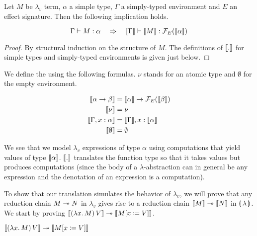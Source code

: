 \begin{property}
  Let $M$ be $\lambda_v$ term, $\alpha$ a simple type, $\Gamma$ a
  simply-typed environment and $E$ an effect signature. Then the following
  implication holds.

$$
\Gamma \vdash M : \alpha
\quad \Rightarrow \quad
\llbracket \Gamma \rrbracket \vdash \llbracket M \rrbracket : \mathcal{F}_E(\llbracket \alpha \rrbracket)
$$
\end{property}

\begin{proof}
  By structural induction on the structure of $M$. The definitions of
  $\llbracket . \rrbracket$ for simple types and simply-typed environments is given just
  below.
\end{proof}

\begin{definition}
We define the  using the
following formulas. $\nu$ stands for an atomic type and $\emptyset$ for the
empty environment.

\begin{align*}
  \llbracket \alpha \to \beta \rrbracket &= \llbracket \alpha \rrbracket \to \mathcal{F}_E(\llbracket \beta \rrbracket) \\
  \llbracket \nu \rrbracket &= \nu \\
  \llbracket \Gamma, x: \alpha \rrbracket &= \llbracket \Gamma \rrbracket, x: \llbracket \alpha \rrbracket \\
  \llbracket \emptyset \rrbracket &= \emptyset
\end{align*}
\end{definition}

We see that we model $\lambda_v$ expressions of type $\alpha$ using
computations that yield values of type $\llbracket \alpha \rrbracket$. $\llbracket . \rrbracket$ translates
the function type so that it takes values but produces computations (since
the body of a $\lambda$-abstraction can in general be any expression and
the denotation of an expression is a computation).

To show that our translation simulates the behavior of $\lambda_v$, we will
prove that any reduction chain $M \twoheadrightarrow N$ in $\lambda_v$ gives rise to a
reduction chain $\llbracket M \rrbracket \twoheadrightarrow \llbracket N \rrbracket$ in $\llparenthesis \, \lambda \, \rrparenthesis$. We start by
proving $\llbracket (\lambda x.\, M)\,V \rrbracket \twoheadrightarrow \llbracket M[x \coloneqq V] \rrbracket$.

\begin{property}
  $\llbracket (\lambda x.\, M)\,V \rrbracket \twoheadrightarrow \llbracket M[x \coloneqq V] \rrbracket$
\end{property}

